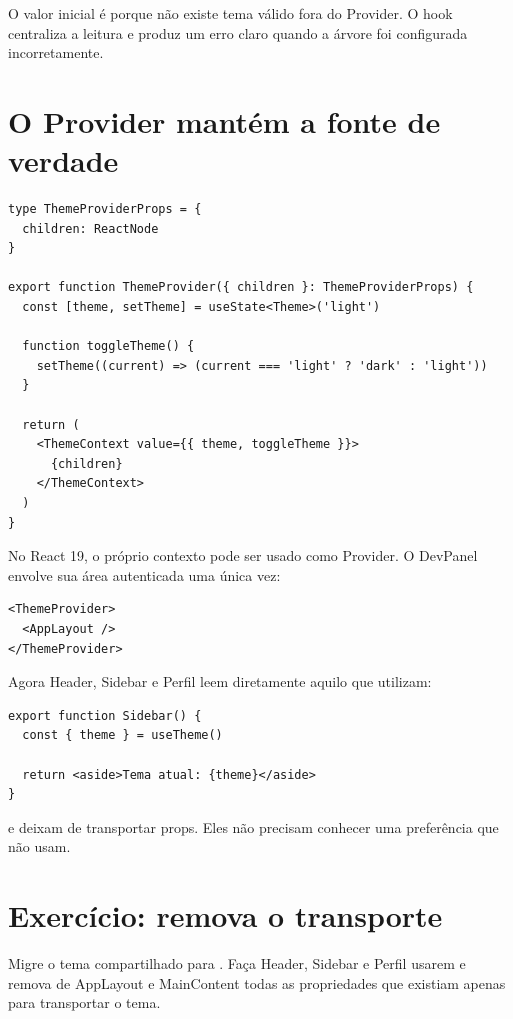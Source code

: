 O valor inicial é  porque não existe tema válido fora do Provider.
O hook  centraliza a leitura e produz um erro claro quando a
árvore foi configurada incorretamente.

\section{O Provider mantém a fonte de verdade}

\begin{lstlisting}[caption={O Provider oferece valor e ação aos descendentes.}]
type ThemeProviderProps = {
  children: ReactNode
}

export function ThemeProvider({ children }: ThemeProviderProps) {
  const [theme, setTheme] = useState<Theme>('light')

  function toggleTheme() {
    setTheme((current) => (current === 'light' ? 'dark' : 'light'))
  }

  return (
    <ThemeContext value={{ theme, toggleTheme }}>
      {children}
    </ThemeContext>
  )
}
\end{lstlisting}

No React 19, o próprio contexto pode ser usado como Provider. O DevPanel envolve
sua área autenticada uma única vez:

\begin{lstlisting}
<ThemeProvider>
  <AppLayout />
</ThemeProvider>
\end{lstlisting}

Agora Header, Sidebar e Perfil leem diretamente aquilo que utilizam:

\begin{lstlisting}
export function Sidebar() {
  const { theme } = useTheme()

  return <aside>Tema atual: {theme}</aside>
}
\end{lstlisting}

 e  deixam de transportar props. Eles não
precisam conhecer uma preferência que não usam.

\section{Exercício: remova o transporte}

\begin{tarefa}
Migre o tema compartilhado para . Faça Header, Sidebar e
Perfil usarem  e remova de AppLayout e MainContent todas as
propriedades que existiam apenas para transportar o tema.
\end{tarefa}

